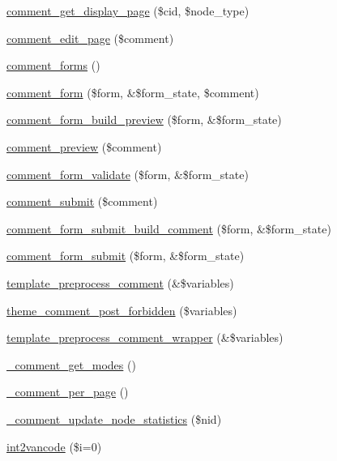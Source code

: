 \begin{DoxyCompactItemize}
\hyperlink{comment_8module_aa5aea9dcbfe48d409e40e1a37b5a9e50}{comment\_\-get\_\-display\_\-page} (\$cid, \$node\_\-type)
\item 
\hyperlink{comment_8module_aaa18c174bbfaca41a522bf30fa17cffa}{comment\_\-edit\_\-page} (\$comment)
\item 
\hyperlink{comment_8module_aab24607a770dc7049e1408597bc4de44}{comment\_\-forms} ()
\item 
\hyperlink{group__forms_ga86e714d86cac517f85b3cadf42ba2977}{comment\_\-form} (\$form, \&\$form\_\-state, \$comment)
\item 
\hyperlink{comment_8module_a70a0f5820c8a9e01dec5112b716a9062}{comment\_\-form\_\-build\_\-preview} (\$form, \&\$form\_\-state)
\item 
\hyperlink{comment_8module_a032c5623dc97e32faf726eeea5618a36}{comment\_\-preview} (\$comment)
\item 
\hyperlink{comment_8module_a37f7362a827269fc4d3f11bf4feae277}{comment\_\-form\_\-validate} (\$form, \&\$form\_\-state)
\item 
\hyperlink{comment_8module_af9a31d3ab86177a7ac7999d049dc0b5f}{comment\_\-submit} (\$comment)
\item 
\hyperlink{comment_8module_abd5446f38e07ea95441adc78dbd3c968}{comment\_\-form\_\-submit\_\-build\_\-comment} (\$form, \&\$form\_\-state)
\item 
\hyperlink{comment_8module_abb91789dc7f908120219fc645e7e1612}{comment\_\-form\_\-submit} (\$form, \&\$form\_\-state)
\item 
\hyperlink{comment_8module_a48adb63c53357fde9aea892ba131f3db}{template\_\-preprocess\_\-comment} (\&\$variables)
\item 
\hyperlink{group__themeable_ga161f469ee8e0de3c126729f154863a11}{theme\_\-comment\_\-post\_\-forbidden} (\$variables)
\item 
\hyperlink{comment_8module_aeccd0447ccb1d7a888c63c47444d54fc}{template\_\-preprocess\_\-comment\_\-wrapper} (\&\$variables)
\item 
\hyperlink{comment_8module_a7a3a5128d41e8563f0649eae12b777c6}{\_\-comment\_\-get\_\-modes} ()
\item 
\hyperlink{comment_8module_a1e6475bf270340be547ae0776f25aee8}{\_\-comment\_\-per\_\-page} ()
\item 
\hyperlink{comment_8module_ac56251d7cb10cf61b8ee999bbbb50547}{\_\-comment\_\-update\_\-node\_\-statistics} (\$nid)
\item 
\hyperlink{comment_8module_a30537163d28e0425bc93b2fb1ec4aa54}{int2vancode} (\$i=0)
\item 

\end{DoxyCompactItemize}
